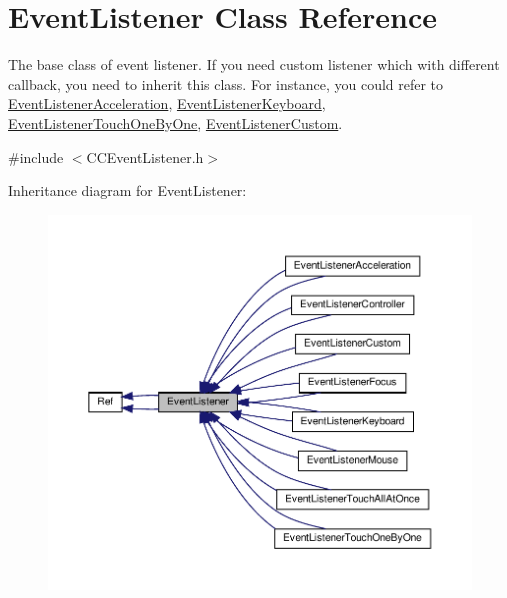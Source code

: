 \hypertarget{classEventListener}{}\section{Event\+Listener Class Reference}
\label{classEventListener}


The base class of event listener. If you need custom listener which with different callback, you need to inherit this class. For instance, you could refer to \hyperlink{classEventListenerAcceleration}{Event\+Listener\+Acceleration}, \hyperlink{classEventListenerKeyboard}{Event\+Listener\+Keyboard}, \hyperlink{classEventListenerTouchOneByOne}{Event\+Listener\+Touch\+One\+By\+One}, \hyperlink{classEventListenerCustom}{Event\+Listener\+Custom}.  




{\ttfamily \#include $<$C\+C\+Event\+Listener.\+h$>$}



Inheritance diagram for Event\+Listener\+:
\nopagebreak
\begin{figure}[H]
\begin{center}
\leavevmode
\includegraphics[width=350pt]{classEventListener__inherit__graph}
\end{center}
\end{figure}


